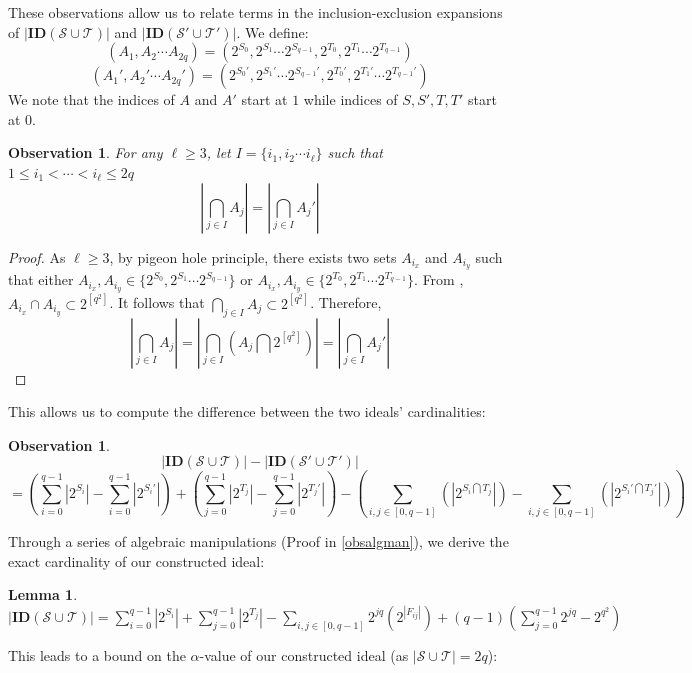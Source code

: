 \documentclass[11pt,a4paper]{article}
\newtheorem{lemma}[theorem]{Lemma}
\newtheorem{observation}[theorem]{Observation}
\theoremstyle{definition}
\begin{document}
These observations allow us to relate terms in the inclusion-exclusion 
expansions of $|\mathbf{ID}(\mathcal{S}\cup \mathcal{T})|$ and 
$|\mathbf{ID}(\mathcal{S}'\cup \mathcal{T}')|$. We define:
$$(A_1,A_2\cdots A_{2q})=(2^{S_0},2^{S_1}\cdots 2^{S_{q-1}},2^{T_0},
2^{T_1}\cdots 2^{T_{q-1}})$$ 
$$(A_1',A_2'\cdots A_{2q}')=(2^{S_0'},2^{S_1'}\cdots 2^{S_{q-1}'},
2^{T_0'},2^{T_1'}\cdots 2^{T_{q-1}'})$$
We note that the indices of $A$ and $A'$ start at $1$ while indices of $S,S',T,T'$ start at $0$.

\begin{observation}\label{twosetsyseq}
	For any $\ell \geq 3$, let $I=\{i_1,i_2\cdots i_{\ell}\}$ such that $1 \leq 
	i_1 < \cdots < i_{\ell} \leq 2q$
	$$ |\bigcap\limits_{j \in I} A_j|= |\bigcap\limits_{j \in I} A_j'|$$
\end{observation}

\begin{proof}
	As $\ell \geq 3$, by pigeon hole principle, there exists two sets $A_{i_x}$ 
	and $A_{i_y}$ such that either $A_{i_x}, A_{i_y} \in \{2^{S_0},2^{S_1}\cdots 
	2^{S_{q-1}}\}$ or $A_{i_x}, A_{i_y} \in \{2^{T_0},2^{T_1}\cdots 
	2^{T_{q-1}}\}$. From , $A_{i_x} \cap A_{i_y} \subset 
	2^{[q^2]}$. It follows that $\bigcap\limits_{j \in I} A_j \subset 2^{[q^2]}$. 
	Therefore, 
	$$ |\bigcap\limits_{j \in I} A_j|= |\bigcap\limits_{j \in I} (A_j\bigcap 
	2^{[q^2]})|  = |\bigcap\limits_{j \in I} A_j'|$$
\end{proof}

This allows us to compute the difference between the two ideals' 
cardinalities:

\begin{observation}\label{obs_fin_st}
	$$|\mathbf{ID}(\mathcal{S}\cup \mathcal{T})|-|\mathbf{ID}(\mathcal{S}'\cup 
	\mathcal{T}')|$$    
	$$=  (\sum_{i=0}^{q-1} |2^{S_i}| - \sum_{i=0}^{q-1} |2^{S_i'}|)+
	(\sum_{j=0}^{q-1} |2^{T_j}| - \sum_{j=0}^{q-1} |2^{T_j'}|)
	-(\sum_{i,j \in [0,q-1]} (|2^{S_i\bigcap T_j}|)-\sum_{i,j \in [0,q-1]} 
	(|2^{S_i'\bigcap T_j'}|))$$
\end{observation}

Through a series of algebraic manipulations (Proof in \cref{obsalgman}), we derive 
the exact cardinality of our constructed ideal:

\begin{lemma}\label{deflemcalc34}
	$|\mathbf{ID}(\mathcal{S}\cup \mathcal{T})| = \sum_{i=0}^{q-1} |2^{S_i}| 
	+ \sum_{j=0}^{q-1} |2^{T_j}| - \sum_{i,j \in [0,q-1]} 2^{jq}(2^{|F_{ij}|})
	+(q-1)(\sum_{j=0}^{q-1} 2^{jq} - 2^{q^2}) $
\end{lemma}
This leads to a bound on the $\alpha$-value of our constructed ideal (as $|\mathcal{S}\cup \mathcal{T}| = 2q$):
\end{document}
